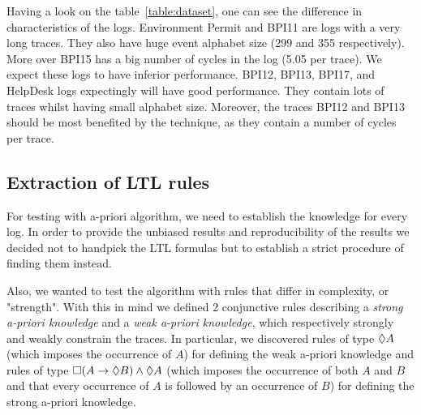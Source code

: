 
Having a look on the table~\ref{table:dataset}, one can see the difference in characteristics of the logs. Environment Permit and BPI11 are logs with a very long traces. They also have huge event alphabet size (299 and 355 respectively). More over BPI15 has a big number of cycles in the log (5.05 per trace). We expect these logs to have inferior performance. BPI12, BPI13, BPI17, and HelpDesk logs expectingly will have good performance. They contain lots of traces whilst having small alphabet size. Moreover, the traces BPI12 and BPI13 should be most benefited by the \nocycle technique, as they contain a number of cycles per trace.


\subsection{Extraction of LTL rules} \label{extractionLTLrules}

For testing with a-priori algorithm, we need to establish the knowledge for every log. In order to provide the unbiased results and reproducibility of the results we decided not to handpick the LTL formulas but to establish a strict procedure of finding them instead.

Also, we wanted to test the algorithm with rules that differ in complexity, or "strength". With this in mind we defined 2 conjunctive rules describing a \textit{strong a-priori knowledge} and a \textit{weak a-priori knowledge}, which respectively strongly and weakly constrain the traces. In particular, we discovered rules of type $\lozenge A$ (which imposes the occurrence of $A$) for defining the weak a-priori knowledge and rules of type $\square(A \rightarrow \lozenge B) \wedge \lozenge A$ (which imposes the occurrence of both $A$ and $B$ and that every occurrence of $A$ is followed by an occurrence of $B$) for defining the strong a-priori knowledge.

